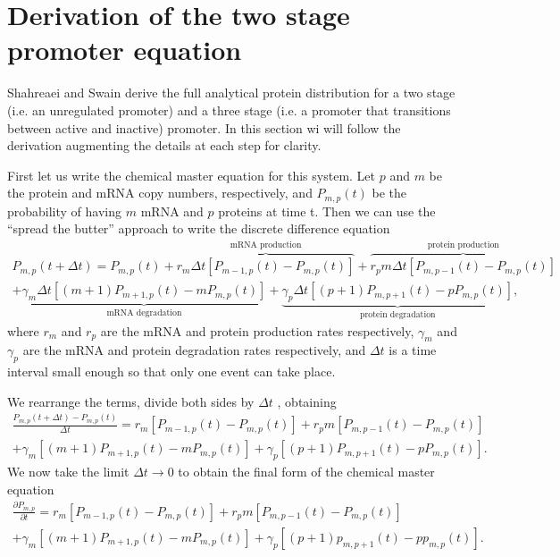 \section{Derivation of the two stage promoter equation}

Shahreaei and Swain derive the full analytical protein distribution for a two
stage (i.e. an unregulated promoter) and a three stage (i.e. a promoter that
transitions between active and inactive) promoter. In this section wi will
follow the derivation augmenting the details at each step for clarity.

First let us write the chemical master equation for this system. Let $p$ and $m$
be the protein and mRNA copy numbers, respectively, and $P_{m,p}(t)$ be the
probability of having $m$ mRNA and $p$ proteins at time t. Then we can use the
``spread the butter'' approach to write the discrete difference equation
\begin{equation}
\begin{aligned}
P_{m,p}(t + \Delta t) =
P_{m,p}(t)
+ \overbrace{r_m \Delta t \left[ P_{m-1,p}(t) - P_{m,p}(t) \right]}^\text{mRNA
production}
+ \overbrace{r_p m
\Delta t \left[ P_{m, p-1}(t) - P_{m, p}(t) \right]}^\text{protein
production}\\
+ \underbrace{\gamma_m \Delta t \left[ (m + 1) P_{m+1,p}(t) - m P_{m, p}(t)
\right]}_\text{mRNA degradation}
+ \underbrace{\gamma_p \Delta t \left[ (p + 1) P_{m, p+1}(t) - p P_{m, p}(t)
\right]}_\text{protein degradation},
\end{aligned}
\end{equation}
where $r_m$ and $r_p$ are the mRNA and protein production rates respectively,
$\gamma_m$ and $\gamma_p$ are the mRNA and protein degradation rates
respectively, and $\Delta t$ is a time interval small enough so that only one
event can take place.

We rearrange the terms, divide both sides by $\Delta t$ , obtaining
\begin{equation}
  \begin{aligned}
\frac{P_{m,p}(t + \Delta t) - P_{m,p}(t)}{\Delta t} = r_m \left[ P_{m-1,p}(t) -
P_{m,p}(t) \right] + r_p m \left[ P_{m, p-1}(t) - P_{m, p}(t) \right]\\
+ \gamma_m \left[ (m + 1) P_{m+1,p}(t) - m P_{m, p}(t) \right] + \gamma_p \left[
 (p + 1) P_{m, p+1}(t) - p P_{m, p}(t) \right].
  \end{aligned}
\end{equation}
We now take the limit $\Delta t \rightarrow 0$ to obtain the final form of the
chemical master equation
\begin{equation}
\begin{aligned}
\frac{\partial P_{m,p}}{\partial t} = r_m \left[ P_{m-1,p}(t) - P_{m,p}(t)
\right] + r_p m \left[ P_{m, p-1}(t) - P_{m, p}(t) \right]\\
+ \gamma_m \left[ (m + 1) P_{m+1,p}(t) - m P_{m, p}(t) \right] + \gamma_p \left[
(p + 1) p_{m, p+1}(t) - p p_{m, p}(t) \right].
  \end{aligned}
\end{equation}

